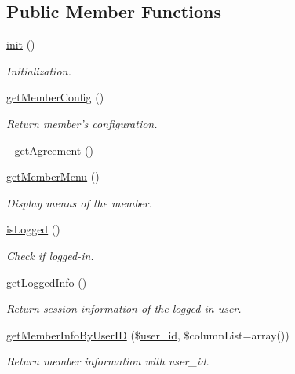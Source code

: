 \subsection*{Public Member Functions}
\begin{DoxyCompactItemize}
\item 
\hyperlink{classmemberModel_ae809c0b0f1c10e0352ad65e7df2a1ac9}{init} ()
\begin{DoxyCompactList}\small\item\em Initialization. \end{DoxyCompactList}\item 
\hyperlink{classmemberModel_a063f34e0a57f8e1c2737318ecd6db8c7}{get\+Member\+Config} ()
\begin{DoxyCompactList}\small\item\em Return member's configuration. \end{DoxyCompactList}\item 
\hyperlink{classmemberModel_a77fb03f9f26568731dfad78b0b1572dd}{\+\_\+get\+Agreement} ()
\item 
\hyperlink{classmemberModel_acd26b1539d27466b84d16d2be10f82cd}{get\+Member\+Menu} ()
\begin{DoxyCompactList}\small\item\em Display menus of the member. \end{DoxyCompactList}\item 
\hyperlink{classmemberModel_a1cae2bd4d961fc6412281111a1565a3d}{is\+Logged} ()
\begin{DoxyCompactList}\small\item\em Check if logged-\/in. \end{DoxyCompactList}\item 
\hyperlink{classmemberModel_a80179b6ef63e1917514c098df24c6e93}{get\+Logged\+Info} ()
\begin{DoxyCompactList}\small\item\em Return session information of the logged-\/in user. \end{DoxyCompactList}\item 
\hyperlink{classmemberModel_a51229368446fed60d67d3349a0ac305c}{get\+Member\+Info\+By\+User\+I\+D} (\$\hyperlink{ko_8install_8php_a74f1a394389d774e5b4cd5d1d15413f7}{user\+\_\+id}, \$column\+List=array())
\begin{DoxyCompactList}\small\item\em Return member information with user\+\_\+id. \end{DoxyCompactList}\item 

\end{DoxyCompactItemize}

